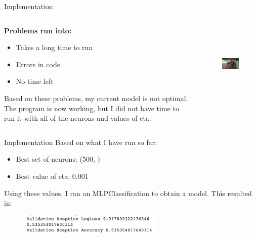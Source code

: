 \documentclass[leqno]{beamer}
\begin{document}
\begin{frame}{Implementation}
    




    \begin{columns}
        \begin{column}{0.45\textwidth}
            \textbf{Problems run into:}
            \begin{itemize}
                \item Takes a long time to run
                \item Errors in code
                \item No time left
            \end{itemize}
            \vspace{0.25in}
            Based on these problems, my current model is not optimal.  The program is now working, 
            but I did not have time to run it with all of the neurons and values of eta.
        \end{column}
        \begin{column}{0.45\textwidth}
            \begin{figure}
                \includegraphics[height=4cm]{dog12.jpg}
            \end{figure}
        \end{column}
    \end{columns}
\end{frame}

\begin{frame}{Implementation}
    Based on what I have run so far:
    \begin{itemize}
        \item Best set of neurons: (500, )
        \item Best value of eta: 0.001
    \end{itemize}
    \pause
    Using these values, I ran an MLPClassification to obtain a model.  This resulted in:
    \begin{figure}
        \includegraphics[height=1cm]{lossAndAccuracy.jpg}
    \end{figure}
\end{frame}
\end{document}
